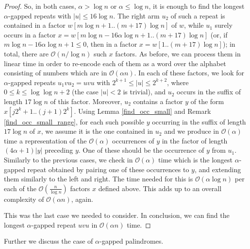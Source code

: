 \documentclass[final]{dmtcs-episciences}
\newcommand{\bigo}{{\mathcal O}}
\begin{document}
\begin{proof}
So, in both cases, $\alpha > \log n$ or $\alpha \leq \log n$, it is enough to find the longest $\alpha$-gapped repeats with $|u|\leq 16 \log n$. The right arm $u_2$ of such a repeat is contained in a factor $w[m\log n+1.. (m+17)\log n]$ of $w$, while $u_1$ surely occurs in a factor $x=w[m\log n-16\alpha\log n+1.. (m+17)\log n]$ (or, if $m\log n-16\alpha\log n+1\leq 0$, then in a factor $x=w[1.. (m+17)\log n]$); in total, there are $\bigo(n/ \log n)$ such $x$ factors. As before, we can process them in linear time in order to re-encode each of them as a word over the alphabet consisting of numbers which are in $\bigo(\alpha n)$. In each of these factors, we look for $\alpha$-gapped repeats $u_1vu_2=uvu$ with $2^{k+1}\leq |u|\leq 2^{k+2}$, where $0\leq k\leq \log\log n + 2$ (the case $|u|<2$ is trivial), and $u_2$ occurs in the suffix of length $17\log n$ of this factor. Moreover, $u_2$ contains a factor $y$ of the form $x[j2^k+1..(j+1)2^{k}]$. Using Lemma \ref{find_occ_small} and Remark \ref{find_occ_small_range}, 
for each such possible $y$ occurring in the suffix of length $17\log n$ of $x$, we assume it is the one contained in $u_2$ and we produce in $\bigo(\alpha)$ time a representation of the $\bigo(\alpha)$ occurrences of $y$ in the factor of length $(4\alpha+1) |y|$ preceding $y$. One of these should be the occurrence of $y$ from $u_1$. Similarly to the previous cases, we check in $\bigo(\alpha)$ time which is the longest $\alpha$-gapped repeat obtained by pairing one of these occurrences to $y$, and extending them similarly to the left and right. The time needed for this is $\bigo(\alpha \log n)$ per each of the $\bigo(\frac{n}{\log n})$ factors $x$ defined above. 
This adds up to an overall complexity of $\bigo(\alpha n)$, again.

This was the last case we needed to consider. In conclusion, we can find the longest $\alpha$-gapped repeat $uvu$ in $\bigo(\alpha n)$ time.
\end{proof}

Further we discuss the case of $\alpha$-gapped palindromes.
\end{document}
